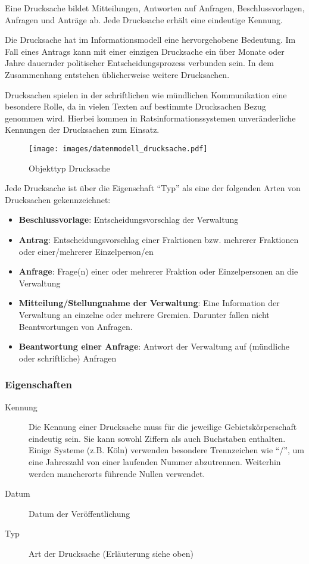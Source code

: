 \documentclass[,a4paper]{article}
\makeatletter
\def\maxwidth{\ifdim\Gin@nat@width>\linewidth\linewidth
\else\Gin@nat@width\fi}
\let\Oldincludegraphics\includegraphics
\renewcommand{\includegraphics}[1]{\Oldincludegraphics[width=\maxwidth]{#1}}
\makeatother
\begin{document}
Eine Drucksache bildet Mitteilungen, Antworten auf Anfragen,
Beschlussvorlagen, Anfragen und Anträge ab. Jede Drucksache erhält eine
eindeutige Kennung.

Die Drucksache hat im Informationsmodell eine hervorgehobene Bedeutung.
Im Fall eines Antrags kann mit einer einzigen Drucksache ein über Monate
oder Jahre dauernder politischer Entscheidungsprozess verbunden sein. In
dem Zusammenhang entstehen üblicherweise weitere Drucksachen.

Drucksachen spielen in der schriftlichen wie mündlichen Kommunikation
eine besondere Rolle, da in vielen Texten auf bestimmte Drucksachen
Bezug genommen wird. Hierbei kommen in Ratsinformationssystemen
unveränderliche Kennungen der Drucksachen zum Einsatz.

\begin{figure}[htbp]
\centering
\texttt{[image: images/datenmodell\_drucksache.pdf]}
\caption{Objekttyp Drucksache}
\end{figure}

Jede Drucksache ist über die Eigenschaft ``Typ'' als eine der folgenden
Arten von Drucksachen gekennzeichnet:

\begin{itemize}
\item
  \textbf{Beschlussvorlage}: Entscheidungsvorschlag der Verwaltung
\item
  \textbf{Antrag}: Entscheidungsvorschlag einer Fraktionen bzw. mehrerer
  Fraktionen oder einer/mehrerer Einzelperson/en
\item
  \textbf{Anfrage}: Frage(n) einer oder mehrerer Fraktion oder
  Einzelpersonen an die Verwaltung
\item
  \textbf{Mitteilung/Stellungnahme der Verwaltung}: Eine Information der
  Verwaltung an einzelne oder mehrere Gremien. Darunter fallen nicht
  Beantwortungen von Anfragen.
\item
  \textbf{Beantwortung einer Anfrage}: Antwort der Verwaltung auf
  (mündliche oder schriftliche) Anfragen
\end{itemize}

\subsubsection{Eigenschaften}

\begin{description}
\item[Kennung]
Die Kennung einer Drucksache muss für die jeweilige Gebietskörperschaft
eindeutig sein. Sie kann sowohl Ziffern als auch Buchstaben enthalten.
Einige Systeme (z.B. Köln) verwenden besondere Trennzeichen wie ``/'',
um eine Jahreszahl von einer laufenden Nummer abzutrennen. Weiterhin
werden mancherorts führende Nullen verwendet.
\item[Datum]
Datum der Veröffentlichung
\item[Typ]
Art der Drucksache (Erläuterung siehe oben)
\end{description}
\end{document}
